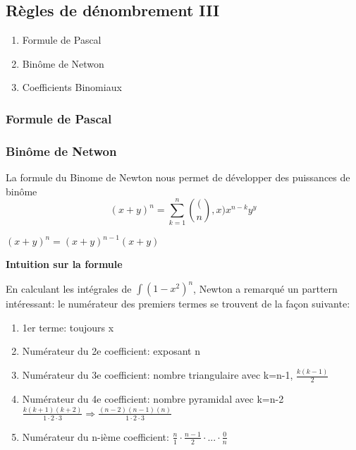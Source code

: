 \documentclass{article}
\begin{document}
\begin{problem}
\end{problem}

\subsection{Règles de dénombrement III}

\begin{enumerate}
    \item Formule de Pascal
    \item Binôme de Netwon
    \item Coefficients Binomiaux
\end{enumerate}

\subsubsection{Formule de Pascal}
\subsubsection{Binôme de Netwon}

La formule du Binome de Newton nous permet de développer des puissances
de binôme
$$ (x+y)^n = \sum^{n}_{k=1} \binom(n,x) x^{n-k} y^y$$

\begin{remark}
    $ (x+y)^n = (x+y)^{n-1} (x+y) $
\end{remark}

\textbf{Intuition sur la formule}

En calculant les intégrales de $ \int (1-x^2)^n$, Newton a remarqué un
parttern intéressant: le numérateur des premiers termes se trouvent de
la façon suivante:
\begin{enumerate}
    \item 1er terme: toujours x
    \item Numérateur du 2e coefficient: exposant n
    \item Numérateur du 3e coefficient: nombre triangulaire avec k=n-1,
	$ \frac{k(k-1)}{2} $
    \item Numérateur du 4e coefficient: nombre pyramidal avec k=n-2
	$ \frac{k(k+1)(k+2)}{1 \cdot 2 \cdot 3} \Longrightarrow
	\frac{(n-2)(n-1)(n)}{1 \cdot 2 \cdot 3} $
    \item Numérateur du n-ième coefficient:
	$ \frac{n}{1} \cdot \frac{n-1}{2} \cdot ... \cdot \frac{0}{n} $
\end{enumerate}
\end{document}
